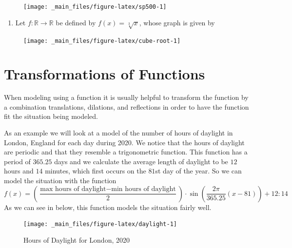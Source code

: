 \documentclass[
]{book}
\providecommand{\tightlist}{%
  \setlength{\itemsep}{0pt}\setlength{\parskip}{0pt}}
\theoremstyle{definition}
\theoremstyle{definition}
\theoremstyle{definition}
\theoremstyle{remark}
\begin{document}
\begin{enumerate}
\begin{figure}
     {\centering \texttt{[image: \_main\_files/figure-latex/sp500-1]} 

     }

     \end{figure}

  \begin{enumerate}
  \def\labelenumii{\alph{enumii}.}
  \tightlist
  \item
    Let \(f:\mathbb{R} \rightarrow \mathbb{R}\) be defined by \(f(x)=\sqrt[3]{x}\), whose graph is given by
  \end{enumerate}

  \begin{figure}

     {\centering \texttt{[image: \_main\_files/figure-latex/cube-root-1]} 

     }

     \end{figure}
\end{enumerate}

\hypertarget{transformations-of-functions}{%
\section{Transformations of Functions}\label{transformations-of-functions}}

When modeling using a function it is usually helpful to transform the function by a combination translations, dilations, and reflections in order to have the function fit the situation being modeled.

As an example we will look at a model of the number of hours of daylight in London, England for each day during 2020. We notice that the hours of daylight are periodic and that they resemble a trigonometric function. This function has a period of \(365.25\) days and we calculate the average length of daylight to be \(12\) hours and \(14\) minutes, which first occurs on the \(81\)st day of the year. So we can model the situation with the function \[f(x)= \left( \frac{\mbox{max hours of daylight} - \mbox{min hours of daylight}}{2}\right) \cdot \sin \left(\frac{2\pi}{365.25} \left(x-81\right)\right) + 12:14\]
As we can see in below, this function models the situation fairly well.

\begin{figure}

{\centering \texttt{[image: \_main\_files/figure-latex/daylight-1]} 

}

\caption{Hours of Daylight for London, 2020}\label{fig:daylight}
\end{figure}
\end{document}
